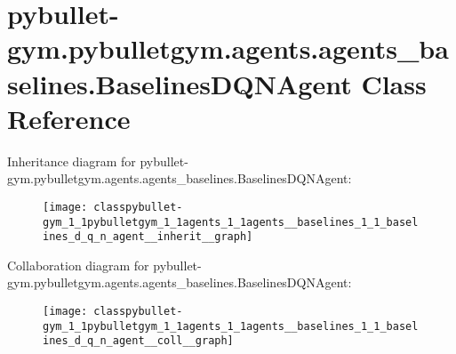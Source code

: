 \hypertarget{classpybullet-gym_1_1pybulletgym_1_1agents_1_1agents__baselines_1_1_baselines_d_q_n_agent}{}\section{pybullet-\/gym.pybulletgym.\+agents.\+agents\+\_\+baselines.\+Baselines\+D\+Q\+N\+Agent Class Reference}
\label{classpybullet-gym_1_1pybulletgym_1_1agents_1_1agents__baselines_1_1_baselines_d_q_n_agent}


Inheritance diagram for pybullet-\/gym.pybulletgym.\+agents.\+agents\+\_\+baselines.\+Baselines\+D\+Q\+N\+Agent\+:
\nopagebreak
\begin{figure}[H]
\begin{center}
\leavevmode
\texttt{[image: classpybullet-gym\_1\_1pybulletgym\_1\_1agents\_1\_1agents\_\_baselines\_1\_1\_baselines\_d\_q\_n\_agent\_\_inherit\_\_graph]}
\end{center}
\end{figure}


Collaboration diagram for pybullet-\/gym.pybulletgym.\+agents.\+agents\+\_\+baselines.\+Baselines\+D\+Q\+N\+Agent\+:
\nopagebreak
\begin{figure}[H]
\begin{center}
\leavevmode
\texttt{[image: classpybullet-gym\_1\_1pybulletgym\_1\_1agents\_1\_1agents\_\_baselines\_1\_1\_baselines\_d\_q\_n\_agent\_\_coll\_\_graph]}
\end{center}
\end{figure}

